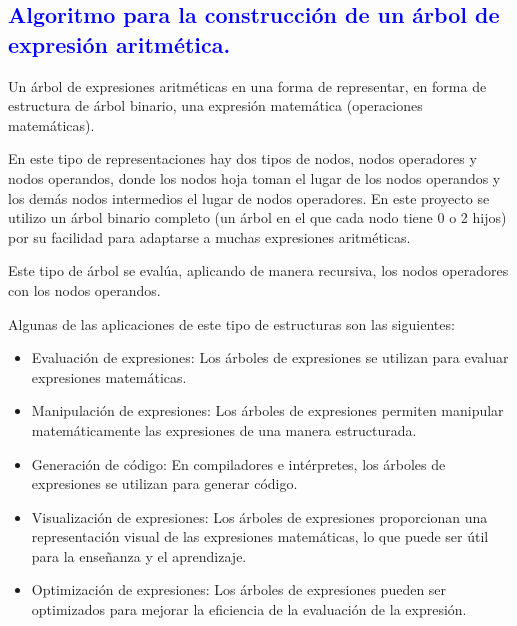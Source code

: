 \documentclass[12pt]{article}
\begin{document}
\subsection*{\textcolor{blue}{Algoritmo para la construcción de un árbol de expresión aritmética. }}

Un árbol de expresiones aritméticas en una forma de representar, en forma de estructura de árbol binario, una expresión matemática (operaciones matemáticas).

En este tipo de representaciones hay dos tipos de nodos, nodos operadores y nodos operandos, donde los nodos hoja toman el lugar de los nodos operandos y los demás nodos intermedios el lugar de nodos operadores. En este proyecto se utilizo un árbol binario completo (un árbol en el que cada nodo tiene 0 o 2 hijos) por su facilidad para adaptarse a muchas expresiones aritméticas.

Este tipo de árbol se evalúa, aplicando de manera recursiva, los nodos operadores con los nodos operandos.

Algunas de las aplicaciones de este tipo de estructuras son las siguientes:
\begin{itemize}
    \item Evaluación de expresiones: Los árboles de expresiones se utilizan para evaluar expresiones matemáticas.
    \item Manipulación de expresiones: Los árboles de expresiones permiten manipular matemáticamente las expresiones de una manera estructurada.
    \item Generación de código: En compiladores e intérpretes, los árboles de expresiones se utilizan para generar código.
    \item Visualización de expresiones: Los árboles de expresiones proporcionan una representación visual de las expresiones matemáticas, lo que puede ser útil para la enseñanza y el aprendizaje.
    \item Optimización de expresiones: Los árboles de expresiones pueden ser optimizados para mejorar la eficiencia de la evaluación de la expresión.
\end{itemize}
\end{document}
